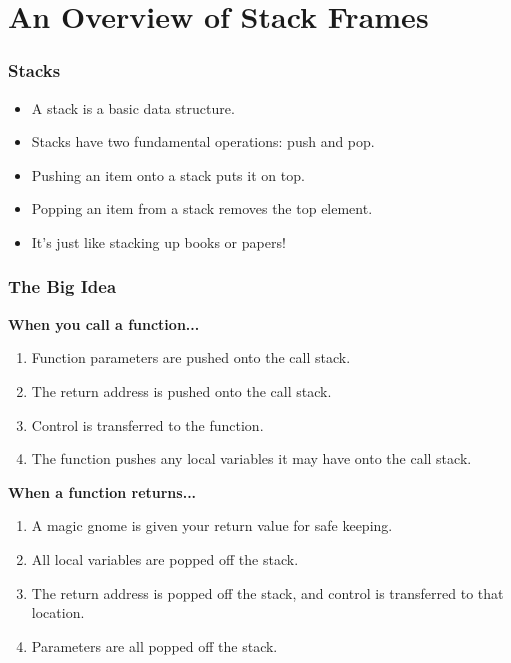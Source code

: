 \documentclass{beamer}
\begin{document}
\section{An Overview of Stack Frames}
\begin{frame}
    \frametitle{Stacks}
    \begin{itemize}[<+->]
        \item A stack is a basic data structure.
        \item Stacks have two fundamental operations: push and pop.
        \item Pushing an item onto a stack puts it on top.
        \item Popping an item from a stack removes the top element.
        \item It's just like stacking up books or papers!
    \end{itemize}
\end{frame}
\begin{frame}
    \frametitle{The Big Idea}
    {\bf When you call a function...}
    \begin{enumerate}[<+->]
        \item Function parameters are pushed onto the call stack.
        \item The return address is pushed onto the call stack.
        \item Control is transferred to the function.
        \item The function pushes any local variables it may have onto the call stack.
    \end{enumerate}
    {\bf When a function returns...}
    \begin{enumerate}[<+->]
        \item A magic gnome is given your return value for safe keeping.
        \item All local variables are popped off the stack.
        \item The return address is popped off the stack, and control is
            transferred to that location.
        \item Parameters are all popped off the stack.
    \end{enumerate}
    
\end{frame}
\end{document}
